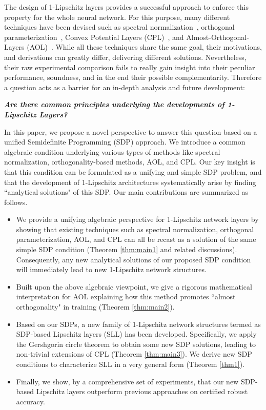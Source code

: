 \documentclass{article} \usepackage{iclr2023_conference,times}
\newcommand{\0}{\mathbf{0} }
\begin{document}
The design of 1-Lipschitz layers provides a successful approach to enforce this property for the whole neural network. For this purpose, many different techniques have been devised such as spectral normalization~\citep{miyato2018spectral,farnia2018generalizable}, orthogonal parameterization~\citep{trockman2021orthogonalizing,li2019preventing,skew2021sahil,yu2022constructing,xulot2022}, Convex Potential Layers (CPL)~\citep{meunier2022dynamical}, and Almost-Orthogonal-Layers (AOL)~\citep{prach2022almost}. While all these techniques share the same goal, their motivations, and derivations can greatly differ, delivering different solutions. Nevertheless, their raw experimental comparison fails to really gain insight into their peculiar performance, soundness, and in the end their possible complementarity. Therefore a question acts as a barrier for an in-depth analysis and future development:
\begin{center}
\textbf{\textit{Are there common principles underlying the developments of 1-Lipschitz Layers?}}
\end{center}
In this paper, we propose a novel perspective to answer this question
based on a unified Semidefinite Programming (SDP) approach.
We introduce a common algebraic condition underlying various types of
methods like spectral normalization, orthogonality-based methods, AOL,
and CPL. Our key insight is that this condition can be formulated as a
unifying and simple SDP problem, and that the development of 1-Lipschitz
architectures systematically arise by finding ``analytical solutions"
of this SDP. Our main contributions are summarized as follows.
\begin{itemize}[leftmargin=10pt,parsep=0pt,topsep=0pt,itemsep=2pt]
    \item We provide a unifying algebraic perspective for 1-Lipschitz network layers by showing that existing techniques such as spectral normalization, orthogonal parameterization, AOL, and CPL can all be recast as a solution of the same simple SDP condition (Theorem \ref{thm:main1} and related discussions). Consequently, any new analytical solutions of our proposed SDP condition will immediately lead to new 1-Lipschitz network structures. 
    \item Built upon the above algebraic viewpoint, we give a rigorous mathematical interpretation for AOL explaining how this method promotes ``almost orthogonality" in training (Theorem \ref{thm:main2}).
    \item Based on our SDPs, a new family of 1-Lipschitz network structures termed as SDP-based Lipschitz layers (SLL) has been developed. Specifically, we apply the Gershgorin circle theorem to obtain some new SDP solutions, leading to non-trivial extensions of CPL (Theorem \ref{thm:main3}). We derive new SDP conditions to characterize SLL in a very general form (Theorem \ref{thm1}).
    \item Finally, we show, by a comprehensive set of experiments, that our new SDP-based Lipschitz layers outperform previous approaches on certified robust accuracy.
\end{itemize}
\end{document}
